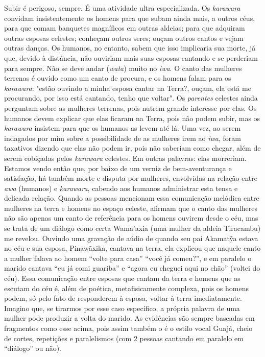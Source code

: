 Subir é perigoso, sempre. É uma atividade ultra especializada. Os
\emph{karawara} convidam insistentemente os homens para que subam ainda
mais, a outros céus, para que comam banquetes magníficos em outras
aldeias; para que adquiram outras esposas celestes; conheçam outros
seres; ouçam outros cantos e vejam outras danças. Os humanos, no
entanto, sabem que isso implicaria sua morte, já que, devido à
distância, não ouviriam mais suas esposas cantando e se perderiam para
sempre. Não se deve andar (\emph{wata}) muito no \emph{iwa}. O canto das
mulheres terrenas é ouvido como um canto de procura, e os homens falam
para os \emph{karawara}: "estão ouvindo a minha esposa cantar na Terra?,
ouçam, ela está me procurando, por isso está cantando, tenho que
voltar". Os \emph{parentes} celestes ainda perguntam sobre as mulheres
terrenas, pois nutrem grande interesse por elas. Os humanos devem
explicar que elas ficaram na Terra, pois não podem subir, mas os
\emph{karawara} insistem para que os humanos as levem até lá. Uma vez,
ao serem indagados por mim sobre a possibilidade de as mulheres irem ao
\emph{iwa}, foram taxativos dizendo que elas não podem ir, pois não
saberiam como chegar, além de serem cobiçadas pelos \emph{karawara}
celestes. Em outras palavras: elas morreriam. Estamos vendo então que,
por baixo de um verniz de bem-aventurança e satisfação, há também morte
e disputa por mulheres, envolvidas na relação entre \emph{awa} (humanos)
e \emph{karawara}, cabendo aos humanos administrar esta tensa e delicada
relação. Quando as pessoas mencionam essa comunicação melódica entre
mulheres na terra e homens no espaço celeste, afirmam que o canto das
mulheres não são apenas um canto de referência para os homens ouvirem
desde o céu, mas se trata de um diálogo como certa Wama'axia (uma mulher
da aldeia Tiracambu) me revelou. Ouvindo uma gravação de aúdio de quando
seu pai Akamatỹa estava no céu e sua esposa, Pinawãxika, cantava na
terra, ela explicou que naquele canto a mulher falava ao homem ``volte
para casa'' ``você já comeu?'', e em paralelo o marido cantava ``eu já
comi guariba'' e ``agora eu cheguei aqui no chão'' (voltei do céu). Essa
comunicação entre esposas que cantam da terra e homens que as escutam do
céu é, além de poética, metafisicamente complexa, pois os homens podem,
só pelo fato de responderem à esposa, voltar à terra imediatamente.
Imagino que, se tirarmos por esse caso específico, a própria palavra de
uma mulher pode produzir a volta do marido. As evidências são sempre
baseadas em fragmentos como esse acima, pois assim também o é o estilo
vocal Guajá, cheio de cortes, repetições e paralelismos (com 2 pessoas
cantando em paralelo em ``diálogo'' ou não).

